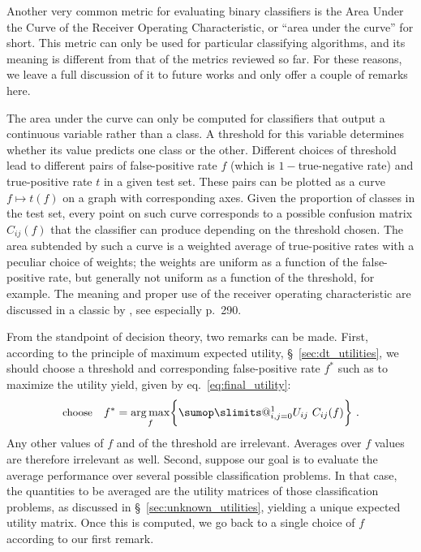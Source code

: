 \documentclass[\ifafour a4paper,12pt,\else a5paper,10pt,\fi%
onecolumn,oneside,article,%
british%
]{memoir}
\makeatletter
\theoremstyle{remark}
\theoremstyle{innote}
\def\sum{\DOTSI\sumop\slimits@}
\DeclarePairedDelimiter\set{\{}{\}} %
\renewcommand*{\|}[1][]{\nonscript\:#1\vert\nonscript\:\mathopen{}}
\newcommand*{\sect}{\S}%
\newcommand*{\eqn}{eq.}%
\DeclareMathOperator*{\argmax}{arg\,max}
\makeatother
\begin{document}
Another very common metric for evaluating binary classifiers is the Area Under the Curve of the Receiver Operating Characteristic, or \enquote{area under the curve} for short. This metric can only be used for particular classifying algorithms, and its meaning is different from that of the metrics reviewed so far. For these reasons, we leave a full discussion of it to future works and only offer a couple of remarks here.

The area under the curve can only be computed for classifiers that output a continuous variable rather than a class. A threshold for this variable determines whether its value predicts one class or the other. Different choices of threshold lead to different pairs of false-positive rate $f$ (which is $1-{}$true-negative rate) and true-positive rate $t$ in a given test set. These pairs can be plotted as a curve $f \mapsto t(f)$ on a graph with corresponding axes. Given the proportion of classes in the test set, every point on such curve corresponds to a possible confusion matrix $C_{ij}(f)$ that the classifier can produce depending on the threshold chosen. The area subtended by such a curve is a weighted average of true-positive rates with a peculiar choice of weights; the weights are uniform as a function of the false-positive rate, but generally not uniform as a function of the threshold, for example. The meaning and proper use of the receiver operating characteristic are discussed in a classic by \cites{metz1978}, see especially p.~290.


\medskip

From the standpoint of decision theory, two remarks can be made\autocites[similar points are made by][]{bakeretal2001,loboetal2008}. First, according to the principle of maximum expected utility, \sect~\ref{sec:dt_utilities}, we should choose a threshold and corresponding false-positive rate $f^{*}$ such as to maximize the utility yield, given by \eqn~\eqref{eq:final_utility}:
\begin{equation}
  \label{eq:threshold_auc_maxutility}
  \text{\small choose}\quad
  f^{*} = \argmax_{f}\set[\bigg]{\sum_{i,j=0}^{1} U_{ij}\ C_{ij}(f)} \ .
\end{equation}
Any other values of $f$ and of the threshold are irrelevant. Averages over $f$ values are therefore irrelevant as well. Second, suppose our goal is to evaluate the average performance over several possible classification problems. In that case, the quantities to be averaged are the utility matrices of those classification problems, as discussed in \sect~\ref{sec:unknown_utilities}, yielding a unique expected utility matrix. Once this is computed, we go back to a single choice of $f$ according to our first remark.
\end{document}
